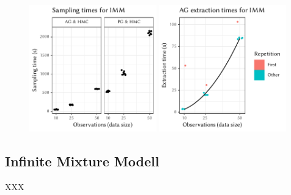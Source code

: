 \cleartoverso
\FloatBlock

\begin{figure}[t!]
  \centering
  \includegraphics[width=0.49\textwidth]{figures/IMM-sampling_times}
  \includegraphics[width=0.49\textwidth]{figures/IMM-compile_times}
  \caption{}
  \label{fig:plots-imm}
\end{figure}

\subsection*{Infinite Mixture Modell}

XXX


